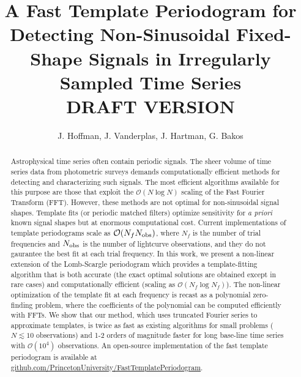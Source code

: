 \documentclass[apj]{emulateapj}
\newcommand{\bigO}{\mathcal{O}}
\begin{document}
\title{A Fast Template Periodogram for Detecting Non-Sinusoidal Fixed-Shape Signals in Irregularly Sampled Time Series\\
         DRAFT VERSION \versioninfo }

\author{J. Hoffman,
J. Vanderplas,
J. Hartman,
G. Bakos}


\begin{abstract}

    Astrophysical time series often contain periodic signals. The sheer volume of time series data from 
    photometric surveys demands computationally efficient methods for detecting and characterizing such signals. 
    The most efficient algorithms available for this purpose are those that exploit the 
    $\bigO(N\log N)$ scaling of the Fast Fourier Transform (FFT). However, these methods are not optimal 
    for non-sinusoidal signal shapes. Template fits (or periodic matched filters) optimize 
    sensitivity for \emph{a priori} known signal shapes but at enormous computational cost. Current 
    implementations of template periodograms scale as $\bigO(N_f N_{\rm obs})$, where $N_f$ is the number 
    of trial frequencies and $N_{\rm obs}$ is the number of lightcurve observations, and they do not 
    gaurantee the best fit at each trial frequency. In this work, we present a non-linear extension of the Lomb-Scargle 
    periodogram which provides a template-fitting algorithm that is both accurate (the exact optimal solutions are
    obtained except in rare cases) and computationally efficient (scaling as $\bigO(N_f\log N_f)$). 
    The non-linear optimization of the template fit at each frequency is recast as a polynomial 
    zero-finding problem, where the coefficients of the polynomial can be computed efficiently with
    FFTs. We show that our method, which uses truncated Fourier series to approximate templates, 
    is twice as fast as existing algorithms for small problems ($N\lesssim 10$ observations) and
    1-2 orders of magnitude faster for long base-line time series with $\bigO(10^4)$ observations.
    An open-source implementation of the fast template periodogram is available at 
    \href{https://www.github.com/PrincetonUniversity/FastTemplatePeriodogram}{github.com/PrincetonUniversity/FastTemplatePeriodogram}. 
\end{abstract}
\end{document}
